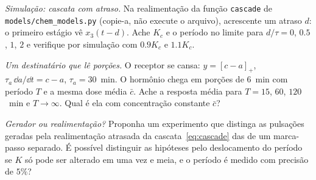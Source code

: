 \begin{exercise}[\lvlB]
\label{ex:16:5}
\emph{Simulação: cascata com atraso.} Na realimentação da função \texttt{cascade} de \texttt{models/\allowbreak chem\_models.py} (copie-a, não execute o arquivo), acrescente um atraso $d$: o primeiro estágio vê $x_3(t-d)$. Ache $K_c$ e o período no limite para $d/\tau=0$, $0.5$, $1$, $2$ e verifique por simulação com $0.9K_c$ e $1.1K_c$.
\end{exercise}

\begin{exercise}[\lvlB]
\label{ex:16:6}
\emph{Um destinatário que lê porções.} O receptor se cansa: $y=[c-a]_+$, $\tau_a\,\dd a/\dd t=c-a$, $\tau_a=30$~min. O hormônio chega em porções de $6$~min com período $T$ e a mesma dose média $\bar c$. Ache a resposta média para $T=15$, $60$, $120$~min e $T\to\infty$. Qual é ela com concentração constante $\bar c$?
\end{exercise}

\begin{exercise}[\lvlC]
\label{ex:16:7}
\emph{Gerador ou realimentação?} Proponha um experimento que distinga as pulsações geradas pela realimentação atrasada da cascata~\eqref{eq:cascade} das de um marca-passo separado. É possível distinguir as hipóteses pelo deslocamento do período se $K$ só pode ser alterado em uma vez e meia, e o período é medido com precisão de $5\%$?
\end{exercise}
